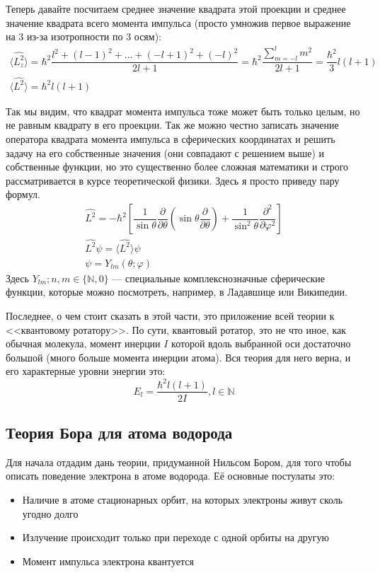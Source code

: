 \documentclass[12pt]{article}
\begin{document}
\vspace{1em} \noindent
Теперь давайте посчитаем среднее значение квадрата этой проекции и среднее значение квадрата всего момента импульса (просто умножив первое выражение на 3 из-за изотропности по 3 осям):
\begin{gather*}
    \langle \hat{L_z^2}\rangle=\hbar^2\dfrac{l^2+ (l-1)^2 +\dots +(-l+1)^2 +(-l)^2}{2l+1} =\hbar^2\dfrac{\sum\limits_{m=-l}^{l}m^2}{2l+1} = \dfrac{\hbar^2}{3}l(l+1)\\
    \langle \hat{L^2}\rangle = \hbar^2l(l+1)
\end{gather*}

\vspace{1em} \noindent
Так мы видим, что квадрат момента импульса тоже может быть только целым, но не равным квадрату в его проекции. Так же можно честно записать значение оператора квадрата момента импульса в сферических координатах и решить задачу на его собственные значения (они совпадают с решением выше) и собственные функции, но это существенно более сложная математики и строго рассматривается в курсе теоретической физики. Здесь я просто приведу пару формул. 
\begin{gather*}
     \hat{L^2} = -\hbar^2 \left[ \dfrac{1}{\sin{\theta}}\dfrac{\partial}{\partial\theta} \left(\sin{\theta}\dfrac{\partial}{\partial \theta}\right) + \dfrac{1}{\sin^2{\theta}}\dfrac{\partial^2}{\partial \varphi^2}\right]\\
     \hat{L^2} \psi = \langle \hat{L^2}\rangle \psi\\
     \psi = Y_{lm}(\theta; \varphi)
\end{gather*}
Здесь $Y_{lm}; n,m \in \{\mathbb{N}, 0\}$ --- специальные комплекснозначные сферические функции, которые можно посмотреть, например, в Ладавшице или Википедии.

\vspace{1em} \noindent
Последнее, о чем стоит сказать в этой части, это приложение всей теории к <<квантовому ротатору>>. По сути, квантовый ротатор, это не что иное, как обычная молекула, момент инерции $I$ которой вдоль выбранной оси достаточно большой (много больше момента инерции атома). Вся теория для него верна, и его характерные уровни энергии это:
\begin{equation}
    E_l=\dfrac{\hbar^2l(l+1)}{2I}, l\in \mathbb{N}
\end{equation}

\subsection{Теория Бора для атома водорода}
Для начала отдадим дань теории, придуманной Нильсом Бором, для того чтобы описать поведение электрона в атоме водорода. Её основные постулаты это:
\begin{itemize}
    \item Наличие в атоме стационарных орбит, на которых электроны живут сколь угодно долго
    \item Излучение происходит только при переходе с одной орбиты на другую
    \item Момент импульса электрона квантуется
\end{itemize}
\end{document}

